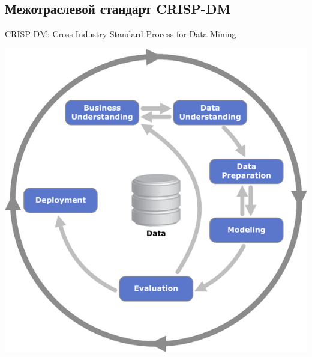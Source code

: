 \documentclass{beamer}
\begin{document}
\subsection{Межотраслевой стандарт CRISP-DM}
\begin{frame}{\large CRISP-DM: Cross Industry Standard Process for Data Mining}
\begin{center}
\includegraphics[width=0.68\linewidth]{fig/CRISP-DM.png}
\end{center}
\end{frame}
\end{document}
